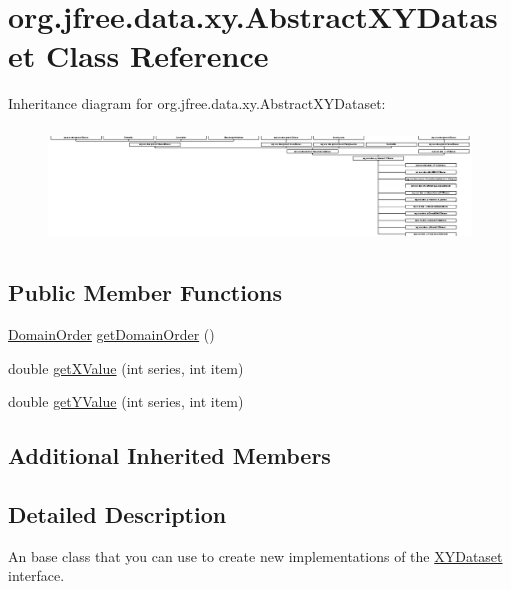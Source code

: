 \hypertarget{classorg_1_1jfree_1_1data_1_1xy_1_1_abstract_x_y_dataset}{}\section{org.\+jfree.\+data.\+xy.\+Abstract\+X\+Y\+Dataset Class Reference}
\label{classorg_1_1jfree_1_1data_1_1xy_1_1_abstract_x_y_dataset}
Inheritance diagram for org.\+jfree.\+data.\+xy.\+Abstract\+X\+Y\+Dataset\+:\begin{figure}[H]
\begin{center}
\leavevmode
\includegraphics[height=3.079179cm]{classorg_1_1jfree_1_1data_1_1xy_1_1_abstract_x_y_dataset}
\end{center}
\end{figure}
\subsection*{Public Member Functions}
\begin{DoxyCompactItemize}
\item 
\mbox{\hyperlink{classorg_1_1jfree_1_1data_1_1_domain_order}{Domain\+Order}} \mbox{\hyperlink{classorg_1_1jfree_1_1data_1_1xy_1_1_abstract_x_y_dataset_a5c1bd55a50eb79df12c9d50894f74866}{get\+Domain\+Order}} ()
\item 
double \mbox{\hyperlink{classorg_1_1jfree_1_1data_1_1xy_1_1_abstract_x_y_dataset_a0d74392c194073e586d8a039767c622f}{get\+X\+Value}} (int series, int item)
\item 
double \mbox{\hyperlink{classorg_1_1jfree_1_1data_1_1xy_1_1_abstract_x_y_dataset_a2a37653acb0e32c2dbf89fd9ca8695fe}{get\+Y\+Value}} (int series, int item)
\end{DoxyCompactItemize}
\subsection*{Additional Inherited Members}


\subsection{Detailed Description}
An base class that you can use to create new implementations of the \mbox{\hyperlink{interfaceorg_1_1jfree_1_1data_1_1xy_1_1_x_y_dataset}{X\+Y\+Dataset}} interface. 

